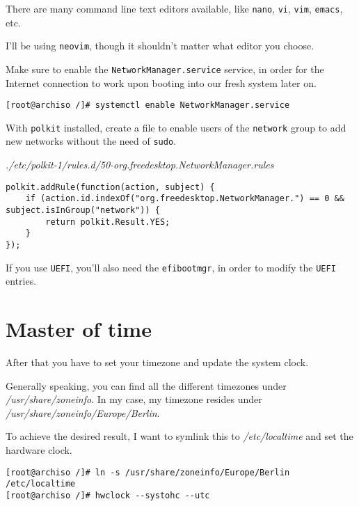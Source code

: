 \documentclass[9pt]{report}
\newenvironment{NOTE}
{\begin{tcolorbox}[colback=admonitionBG,coltitle=draculaFG,colframe=draculaBlue,colbacktitle=draculaBlue,title=NOTE]}
{\end{tcolorbox}}
\newenvironment{mintedlisting}{\captionsetup{format=plain,width=.75\textwidth,type=listing}}{}
\let\ab\allowbreak
\begin{document}
\begin{NOTE}
    There are many command line text editors available, like \texttt{nano}, \texttt{vi}, \texttt{vim}, \texttt{emacs}, etc.


    I’ll be using \texttt{neovim}, though it shouldn’t matter what editor you choose.

\end{NOTE}
Make sure to enable the \texttt{NetworkManager.service} service, in order for the Internet connection to work upon booting into our fresh system later on.


\begin{verbatim}
[root@archiso /]# systemctl enable NetworkManager.service
\end{verbatim}

With \texttt{polkit} installed, create a file to enable users of the \texttt{network} group to add new networks without the need of \texttt{sudo}.


\begin{mintedlisting}
    \caption*{\textit{./etc/\ab{}polkit-1/\ab{}rules.d/\ab{}50-org.freedesktop.NetworkManager.rules}}
    \begin{verbatim}
polkit.addRule(function(action, subject) {
    if (action.id.indexOf("org.freedesktop.NetworkManager.") == 0 && subject.isInGroup("network")) {
        return polkit.Result.YES;
    }
});
    \end{verbatim}
\end{mintedlisting}

If you use \texttt{UEFI}, you’ll also need the \texttt{efibootmgr}, in order to modify the \texttt{UEFI} entries.

\newpage

\hypertarget{x-master-of-time}{\section{Master of time}}
After that you have to set your timezone and update the system clock.


Generally speaking, you can find all the different timezones under \textit{/usr/\ab{}share/\ab{}zoneinfo}.
In my case, my timezone resides under \textit{/usr/\ab{}share/\ab{}zoneinfo/\ab{}Europe/\ab{}Berlin}.


To achieve the desired result, I want to symlink this to \textit{/etc/localtime} and set the hardware clock.


\begin{verbatim}
[root@archiso /]# ln -s /usr/share/zoneinfo/Europe/Berlin /etc/localtime
[root@archiso /]# hwclock --systohc --utc
\end{verbatim}
\end{document}
